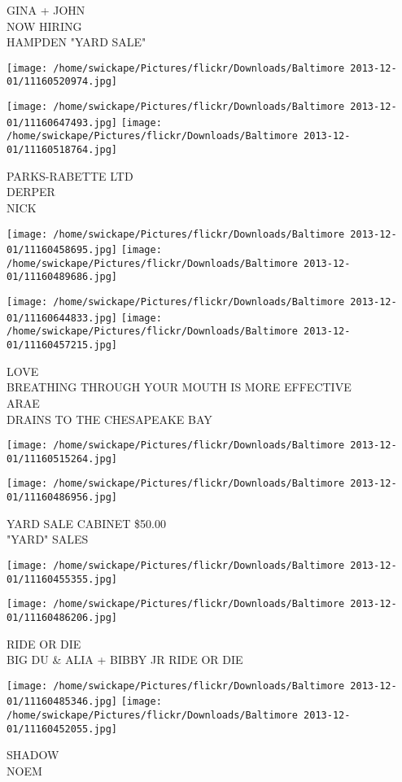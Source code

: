 \documentclass[10pt,letterpaper]{article}
\begin{document}
GINA + JOHN\\
NOW HIRING\\
HAMPDEN "YARD SALE"\\
\pagebreak

\texttt{[image: /home/swickape/Pictures/flickr/Downloads/Baltimore 2013-12-01/11160520974.jpg]}

\vspace{0.25in}
\texttt{[image: /home/swickape/Pictures/flickr/Downloads/Baltimore 2013-12-01/11160647493.jpg]}
\texttt{[image: /home/swickape/Pictures/flickr/Downloads/Baltimore 2013-12-01/11160518764.jpg]}

PARKS{-}RABETTE LTD\\
DERPER\\
NICK\\
\pagebreak

\texttt{[image: /home/swickape/Pictures/flickr/Downloads/Baltimore 2013-12-01/11160458695.jpg]}
\texttt{[image: /home/swickape/Pictures/flickr/Downloads/Baltimore 2013-12-01/11160489686.jpg]}

\texttt{[image: /home/swickape/Pictures/flickr/Downloads/Baltimore 2013-12-01/11160644833.jpg]}
\texttt{[image: /home/swickape/Pictures/flickr/Downloads/Baltimore 2013-12-01/11160457215.jpg]}

LOVE\\
BREATHING THROUGH YOUR MOUTH IS MORE EFFECTIVE\\
ARAE\\
DRAINS TO THE CHESAPEAKE BAY\\
\pagebreak

\texttt{[image: /home/swickape/Pictures/flickr/Downloads/Baltimore 2013-12-01/11160515264.jpg]}

\vspace{0.25in}
\texttt{[image: /home/swickape/Pictures/flickr/Downloads/Baltimore 2013-12-01/11160486956.jpg]}

YARD SALE CABINET \$50.00\\
"YARD" SALES\\
\pagebreak

\texttt{[image: /home/swickape/Pictures/flickr/Downloads/Baltimore 2013-12-01/11160455355.jpg]}

\vspace{0.25in}
\texttt{[image: /home/swickape/Pictures/flickr/Downloads/Baltimore 2013-12-01/11160486206.jpg]}

RIDE OR DIE\\
BIG DU \& ALIA + BIBBY JR RIDE OR DIE\\
\pagebreak

\texttt{[image: /home/swickape/Pictures/flickr/Downloads/Baltimore 2013-12-01/11160485346.jpg]}
\texttt{[image: /home/swickape/Pictures/flickr/Downloads/Baltimore 2013-12-01/11160452055.jpg]}

SHADOW\\
NOEM\\
\pagebreak
\end{document}
